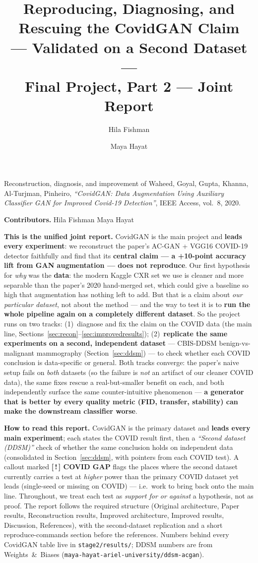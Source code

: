 \documentclass[11pt]{article}
\title{\textbf{Reproducing, Diagnosing, and Rescuing the CovidGAN Claim}\\[2pt]
\large --- Validated on a Second Dataset ---\\[6pt]
\normalsize Final Project, Part 2 --- Joint Report}
\author{Hila Fishman \and Maya Hayat}
\date{}
\newcommand{\code}[1]{\texttt{#1}}
\begin{document}
\maketitle
\vspace{-2.0em}

\noindent
Reconstruction, diagnosis, and improvement of Waheed, Goyal, Gupta, Khanna,
Al-Turjman, Pinheiro, \emph{``CovidGAN: Data Augmentation Using Auxiliary
Classifier GAN for Improved Covid-19 Detection''}, IEEE Access, vol.~8, 2020.

\medskip
\noindent\textbf{Contributors.} Hila Fishman \quad Maya Hayat

\medskip
\noindent
\textbf{This is the unified joint report.} CovidGAN is the main project and
\textbf{leads every experiment}: we reconstruct the paper's AC-GAN + VGG16 COVID-19
detector faithfully and find that its \textbf{central claim --- a +10-point accuracy
lift from GAN augmentation --- does not reproduce}. Our first hypothesis for
\emph{why} was the \textbf{data}: the modern Kaggle CXR set we use is cleaner and
more separable than the paper's 2020 hand-merged set, which could give a baseline so
high that augmentation has nothing left to add. But that is a claim about \emph{our
particular dataset}, not about the method --- and the way to test it is to
\textbf{run the whole pipeline again on a completely different dataset}. So the
project runs on two tracks: (1)~diagnose and fix the claim on the COVID data (the
main line, Sections~\ref{sec:recon}--\ref{sec:improvedresults}); (2)~\textbf{replicate
the same experiments on a second, independent dataset} --- CBIS-DDSM
benign-vs-malignant mammography (Section~\ref{sec:ddsm}) --- to check whether each
COVID conclusion is data-specific or general. Both tracks converge: the paper's naive
setup fails on \emph{both} datasets (so the failure is \emph{not} an artifact of our
cleaner COVID data), the same fixes rescue a real-but-smaller benefit on each, and
both independently surface the same counter-intuitive phenomenon --- \textbf{a
generator that is better by every quality metric (FID, transfer, stability) can make
the downstream classifier worse}.

\medskip
\noindent\textbf{How to read this report.} CovidGAN is the primary dataset and
\textbf{leads every main experiment}; each states the COVID result first, then a
\emph{``Second dataset (DDSM)''} check of whether the same conclusion holds on
independent data (consolidated in Section~\ref{sec:ddsm}, with pointers from each
COVID test). A callout marked \textbf{[\,!\,] COVID GAP} flags the places where the
second dataset currently carries a test at \emph{higher} power than the primary
COVID dataset yet leads (single-seed or missing on COVID) --- i.e.\ work to bring
back onto the main line. Throughout, we treat each test as \emph{support for or
against} a hypothesis, not as proof. The report follows the required structure
(Original architecture, Paper results, Reconstruction results, Improved architecture,
Improved results, Discussion, References), with the second-dataset replication and a
short reproduce-commands section before the references. Numbers behind every CovidGAN
table live in \code{stage2/results/}; DDSM numbers are from Weights~\&~Biases
(\code{maya-hayat-ariel-university/ddsm-acgan}).
\end{document}
